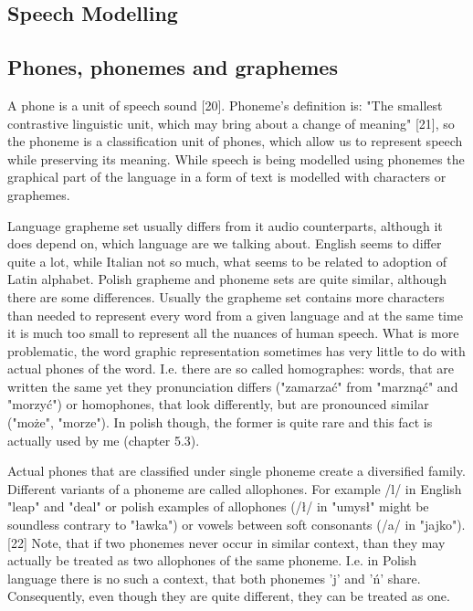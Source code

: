 \documentclass[12pt,a4paper,english]{article}
\begin{document}
\newpage
\begin{center}
    \section{Speech Modelling}
\end {center}
\setcounter{equation}{0}

\subsection{Phones, phonemes and graphemes}

A phone is a unit of speech sound [20]. Phoneme's definition is: "The smallest contrastive linguistic unit, which may bring about a change of meaning" [21], so the phoneme is a classification unit of phones, which allow us to represent speech while preserving its meaning.  While speech is being modelled using phonemes the graphical part of the language in a form of text is modelled with characters or graphemes. \newline

Language grapheme set usually differs from it audio counterparts, although it does depend on, which language are we talking about. English seems to differ quite a lot, while Italian not so much, what seems to be related to adoption of Latin alphabet. Polish grapheme and phoneme sets are quite similar, although there are some differences. Usually the grapheme set contains more characters than needed to represent every word from a given language and at the same time it is much too small to represent all the nuances of human speech. What is more problematic, the word graphic representation sometimes has very little to do with actual phones of the word. I.e. there are so called homographes: words, that are written the same yet they pronunciation differs ("zamarzać" from "marznąć" and "morzyć") or homophones, that look differently, but are pronounced similar ("może", "morze"). In polish though, the former is quite rare and this fact is actually used by me (chapter 5.3). \newline


Actual phones that are classified under single phoneme create a diversified family.  Different variants of a phoneme are called allophones. For example /l/ in English "leap" and "deal" or polish examples of allophones (/ł/ in "umysł" might be soundless contrary to "ławka") or vowels between soft consonants (/a/ in "jajko"). [22] Note, that if two phonemes never occur in similar context, than they may actually be treated as two allophones of the same phoneme. I.e. in Polish language there is no such a context, that both phonemes 'j' and 'ń' share. Consequently, even though they are quite different, they can be treated as one. \newline
\end{document}
